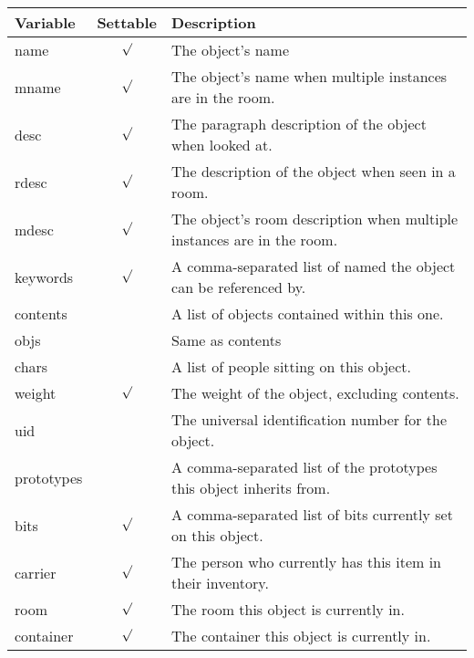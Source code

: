 \documentclass[12pt]{article}
\begin{document}
\begin{tabular}{|l|c|l|}
\hline
Variable & Settable & Description \\
\hline
name    & \begin{math}\surd\end{math} & The object's name \\
mname   & \begin{math}\surd\end{math} & The object's name when multiple instances are in the room. \\
desc    & \begin{math}\surd\end{math} & The paragraph description of the object when looked at. \\
rdesc   & \begin{math}\surd\end{math} & The description of the object when seen in a room. \\
mdesc   & \begin{math}\surd\end{math} & The object's room description when multiple instances are in the room. \\
keywords & \begin{math}\surd\end{math} & A comma-separated list of named the object can be referenced by. \\ 
contents& & A list of objects contained within this one. \\
objs    & & Same as contents \\
chars   & & A list of people sitting on this object. \\
weight  & \begin{math}\surd\end{math} & The weight of the object, excluding contents. \\ 
uid     & & The universal identification number for the object. \\
prototypes & & A comma-separated list of the prototypes this object inherits from. \\
bits    &  \begin{math}\surd\end{math} & A comma-separated list of bits currently set on this object. \\
carrier & \begin{math}\surd\end{math} & The person who currently has this item in their inventory. \\
room    &  \begin{math}\surd\end{math}& The room this object is currently in. \\
container&  \begin{math}\surd\end{math}& The container this object is currently in. \\
\hline
\end{tabular}
\end{document}
